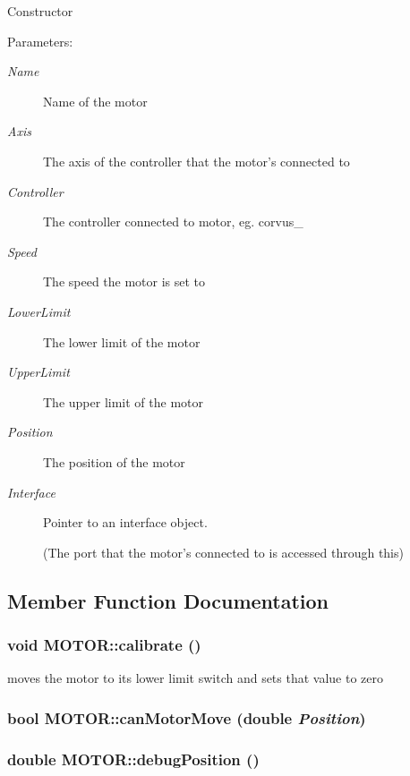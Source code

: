 Constructor \begin{Desc}
\item[Parameters:]
\begin{description}
\item[{\em Name}]Name of the motor \item[{\em Axis}]The axis of the controller that the motor's connected to \item[{\em Controller}]The controller connected to motor, eg. corvus\_ \item[{\em Speed}]The speed the motor is set to \item[{\em Lower\-Limit}]The lower limit of the motor \item[{\em Upper\-Limit}]The upper limit of the motor \item[{\em Position}]The position of the motor \item[{\em Interface}]Pointer to an interface object.\par
(The port that the motor's connected to is accessed through this) \end{description}
\end{Desc}


\subsection{Member Function Documentation}
\subsubsection{\setlength{\rightskip}{0pt plus 5cm}void MOTOR::calibrate ()}\label{classMOTOR_559ed17727398a76e538a8d97c6f78b4}


moves the motor to its lower limit switch and sets that value to zero 
\subsubsection{\setlength{\rightskip}{0pt plus 5cm}bool MOTOR::can\-Motor\-Move (double {\em Position})}\label{classMOTOR_7099d244e8e477f294b6cbdefd12f628}


\subsubsection{\setlength{\rightskip}{0pt plus 5cm}double MOTOR::debug\-Position ()}\label{classMOTOR_3e1eace9569960fb88109ea683bdd5e1}


